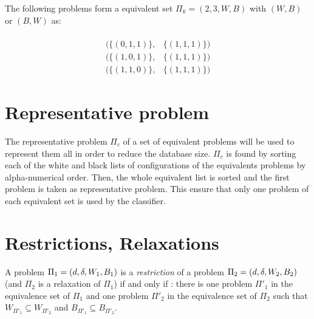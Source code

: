 \begin{exmp}\label{exp_def_2}
The following problems form a equivalent set $\Pi_k = (2,3,W,B)$ with $(W,B)$ or $(B,W)$ as:\\\\
$$\begin{array}{cc}
    ( \{(0,1,1)\}, &  \{(1,1,1)\} )\\
    ( \{(1,0,1)\}, &  \{(1,1,1)\} )\\
    ( \{(1,1,0)\}, &  \{(1,1,1)\} )
\end{array}$$
\end{exmp}

\section{Representative problem}
The representative problem $\Pi_c$ of a set of equivalent problems will be used to represent them all in order to reduce the database size. $\Pi_c$ is found by sorting each of the white and black lists of configurations of the equivalents problems by alpha-numerical order. Then, the whole equivalent list is sorted and the first problem is taken as representative problem. This ensure that only one problem of each equivalent set is used by the classifier.
\section{Restrictions, Relaxations}
A problem $\Pi_1 = (d,\delta,W_1,B_1)$ is a \textit{restriction} of a problem $\Pi_2 = (d,\delta,W_2,B_2)$ (and $\Pi_2$ is a relaxation of $\Pi_1$) if and only if : there is one problem $\Pi'_1$ in the equivalence set of $\Pi_1$ and one problem $\Pi'_2$ in the equivalence set of $\Pi_2$ such that $W_{\Pi'_1}\subseteq W_{\Pi'_2}$ and $B_{\Pi'_1}\subseteq B_{\Pi'_2}$.